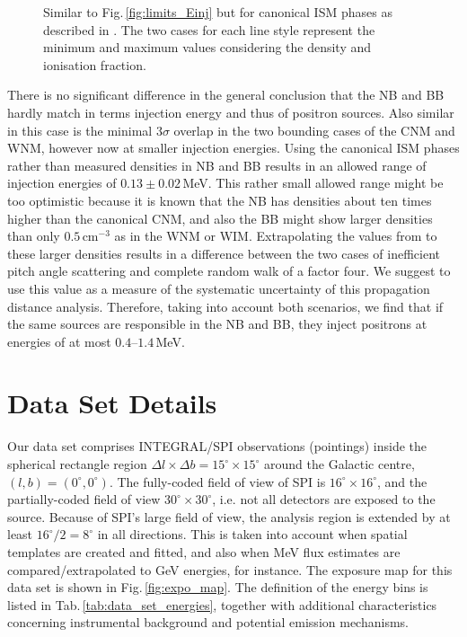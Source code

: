 \documentclass[doublespace,nopageskip]{VTthesis} %
\newcommand{\mrm}[1]{\mathrm{#1}}
\begin{document}
\begin{appendices}
\begin{figure}
		\caption{Similar to Fig.\,\ref{fig:limits_Einj} but for canonical ISM phases as described in \citet{Jean2009_511ISM}. The two cases for each line style represent the minimum and maximum values considering the density and ionisation fraction.}%
		\label{fig:ISM_Einj_results_appendix}%
	\end{figure}
	There is no significant difference in the general conclusion that the NB and BB hardly match in terms injection energy and thus of positron sources.
	Also similar in this case is the minimal $3\sigma$ overlap in the two bounding cases of the CNM and WNM, however now at smaller injection energies.
	Using the canonical ISM phases rather than measured densities in NB and BB results in an allowed range of injection energies of $0.13 \pm 0.02$\,MeV.
	This rather small allowed range might be too optimistic because it is known that the NB has densities about ten times higher than the canonical CNM, and also the BB might show larger densities than only $0.5\,\mrm{cm^{-3}}$ as in the WNM or WIM.
	Extrapolating the values from \citet{Jean2009_511ISM} to these larger densities results in a difference between the two cases of inefficient pitch angle scattering and complete random walk of a factor four.
	We suggest to use this value as a measure of the systematic uncertainty of this propagation distance analysis.
	Therefore, taking into account both scenarios, we find that if the same sources are responsible in the NB and BB, they inject positrons at energies of at most $0.4$--$1.4$\,MeV.
	
	
	
	
	\section{Data Set Details}\label{sec:data_set_details}
	
	Our data set comprises INTEGRAL/SPI observations (pointings) inside the spherical rectangle region $\Delta l \times \Delta b = 15^{\circ} \times 15^{\circ}$ around the Galactic centre, $(l,b) = (0^{\circ},0^{\circ})$.
	The fully-coded field of view of SPI is $16^{\circ}\times16^{\circ}$, and the partially-coded field of view $30^{\circ}\times30^{\circ}$, i.e. not all detectors are exposed to the source.
	Because of SPI's large field of view, the analysis region is extended by at least $16^{\circ}/2 = 8^{\circ}$ in all directions.
	This is taken into account when spatial templates are created and fitted, and also when MeV flux estimates are compared/extrapolated to GeV energies, for instance.
	The exposure map for this data set is shown in Fig.\,\ref{fig:expo_map}.
	The definition of the energy bins is listed in Tab.\,\ref{tab:data_set_energies}, together with additional characteristics concerning instrumental background and potential emission mechanisms.
	

\end{appendices}
\end{document}
